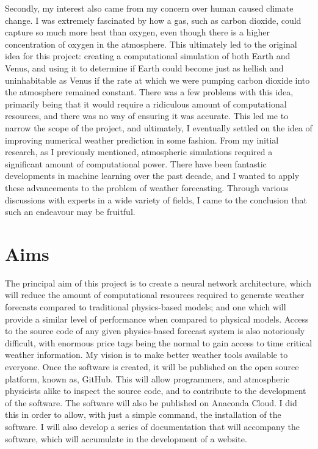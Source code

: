 Secondly, my interest also came from my concern over human caused climate change. I was extremely fascinated by how a gas, such as carbon dioxide, could capture so much more heat than oxygen, even though there is a higher concentration of oxygen in the atmosphere. This ultimately led to the original idea for this project: creating a computational simulation of both Earth and Venus, and using it to determine if Earth could become just as hellish and uninhabitable as Venus if the rate at which we were pumping carbon dioxide into the atmosphere remained constant. There was a few problems with this idea, primarily being that it would require a ridiculous amount of computational resources, and there was no way of ensuring it was accurate. This led me to narrow the scope of the project, and ultimately, I eventually settled on the idea of improving numerical weather prediction in some fashion. From my initial research, as I previously mentioned, atmospheric simulations required a significant amount of computational power. There have been fantastic developments in machine learning over the past decade, and I wanted to apply these advancements to the problem of weather forecasting. Through various discussions with experts in a wide variety of fields, I came to the conclusion that such an endeavour may be fruitful.

\section{Aims}
The principal aim of this project is to create a neural network architecture, which will reduce the amount of computational resources required to generate weather forecasts compared to traditional physics-based models; and one which will provide a similar level of performance when compared to physical models. Access to the source code of any given physics-based forecast system is also notoriously difficult, with enormous price tags being the normal to gain access to time critical weather information. My vision is to make better weather tools available to everyone. Once the software is created, it will be published on the open source platform, known as, GitHub. This will allow programmers, and atmospheric physicists alike to inspect the source code, and to contribute to the development of the software. The software will also be published on Anaconda Cloud. I did this in order to allow, with just a simple command, the installation of the software. I will also develop a series of documentation that will accompany the software, which will accumulate in the development of a website.

